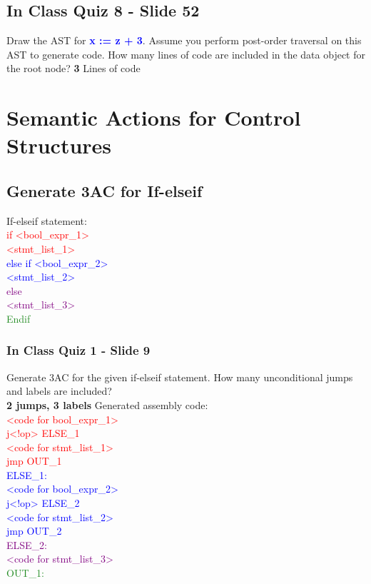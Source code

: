 \documentclass{report}
\newcommand{\textb}[1]{\textcolor{blue}{#1}}
\newcommand{\textg}[1]{\textcolor{ForestGreen}{#1}}
\newcommand{\textp}[1]{\textcolor{purple}{#1}}
\newcommand{\textr}[1]{\textcolor{red}{#1}}
\newcommand{\textbfb}[1]{\textbf{\textb{#1}}}
\newlength\tindent
\renewcommand{\indent}{\hspace*{\tindent}}
\begin{document}
\section{In Class Quiz 8 - Slide 52}
Draw the AST for \textbfb{x := z + 3}. Assume you perform post-order traversal
on this AST to generate code. How many lines of code are included in
the data object for the root node? \textbf{3} Lines of code


\chapter{Semantic Actions for Control Structures}
\section{Generate 3AC for If-elseif}
\vspace{-1em}
\begin{multicols}{2}
If-elseif statement: \\
\textr{if <bool\_expr\_1>} \\
\indent \textr{<stmt\_list\_1>} \\
\textb{else if <bool\_expr\_2>} \\
\indent \textb{<stmt\_list\_2>} \\
\textp{else} \\
\indent \textp{<stmt\_list\_3>} \\
\textg{Endif}


\subsection{In Class Quiz 1 - Slide 9}
\vspace{.5em}
Generate 3AC for the given if-elseif statement.
How many unconditional jumps and labels are included? \\
\textbf{2 jumps, 3 labels}
  \vfill\columnbreak
Generated assembly code: \\
\indent \textr{<code for bool\_expr\_1>} \\
\indent \textr{j<!op> ELSE\_1} \\
\indent \textr{<code for stmt\_list\_1>} \\
\indent \textr{jmp OUT\_1} \\
\textb{ELSE\_1:} \\
\indent \textb{<code for bool\_expr\_2>} \\
\indent \textb{j<!op> ELSE\_2} \\
\indent \textb{<code for stmt\_list\_2>} \\
\indent \textb{jmp OUT\_2} \\
\textp{ELSE\_2:} \\
\indent \textp{<code for stmt\_list\_3>} \\
\textg{OUT\_1:}
\end{multicols}
\end{document}

